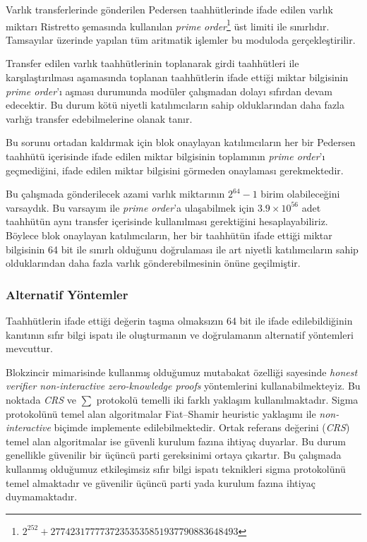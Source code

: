 \documentclass[a4paper,11pt]{article}
\begin{document}
Varlık transferlerinde gönderilen Pedersen taahhütlerinde ifade edilen varlık miktarı Ristretto şemasında kullanılan \emph{prime order}\footnote{$2^{252} + 27742317777372353535851937790883648493$} üst limiti ile sınırlıdır. Tamsayılar üzerinde yapılan tüm aritmatik işlemler bu moduloda gerçekleştirilir.

Transfer edilen varlık taahhütlerinin toplanarak girdi taahhütleri ile karşılaştırılması aşamasında toplanan taahhütlerin ifade ettiği miktar bilgisinin \emph{prime order}'ı aşması durumunda modüler çalışmadan dolayı sıfırdan devam edecektir. Bu durum kötü niyetli katılımcıların sahip olduklarından daha fazla varlığı transfer edebilmelerine olanak tanır.

Bu sorunu ortadan kaldırmak için blok onaylayan katılımcıların her bir Pedersen taahhütü içerisinde ifade edilen miktar bilgisinin toplamının \emph{prime order}'ı geçmediğini, ifade edilen miktar bilgisini görmeden onaylaması gerekmektedir.

Bu çalışmada gönderilecek azami varlık miktarının $2^{64}-1$ birim olabileceğini varsaydık. Bu varsayım ile \emph{prime order}'a ulaşabilmek için $3.9 \times 10^{56}$ adet taahhütün aynı transfer içerisinde kullanılması gerektiğini hesaplayabiliriz. Böylece blok onaylayan katılımcıların, her bir taahhütün ifade ettiği miktar bilgisinin 64 bit ile sınırlı olduğunu doğrulaması ile art niyetli katılımcıların sahip olduklarından daha fazla varlık gönderebilmesinin önüne geçilmiştir.

\subsubsection{Alternatif Yöntemler}

Taahhütlerin ifade ettiği değerin taşma olmaksızın 64 bit ile ifade edilebildiğinin kanıtının sıfır bilgi ispatı ile oluşturmanın ve doğrulamanın alternatif yöntemleri mevcuttur.

Blokzincir mimarisinde kullanmış olduğumuz mutabakat özelliği sayesinde \emph{honest verifier non-interactive zero-knowledge proofs} yöntemlerini kullanabilmekteyiz. Bu noktada \emph{CRS} ve $\sum$ protokolü temelli iki farklı yaklaşım kullanılmaktadır. Sigma protokolünü temel alan algoritmalar Fiat–Shamir heuristic\cite{fiatshamir} yaklaşımı ile \emph{non-interactive} biçimde implemente edilebilmektedir. Ortak referans değerini (\emph{CRS}) temel alan algoritmalar ise güvenli kurulum fazına ihtiyaç duyarlar. Bu durum genellikle güvenilir bir üçüncü parti gereksinimi ortaya çıkartır. Bu çalışmada kullanmış olduğumuz etkileşimsiz sıfır bilgi ispatı teknikleri sigma protokolünü temel almaktadır ve güvenilir üçüncü parti yada kurulum fazına ihtiyaç duymamaktadır.
\end{document}
